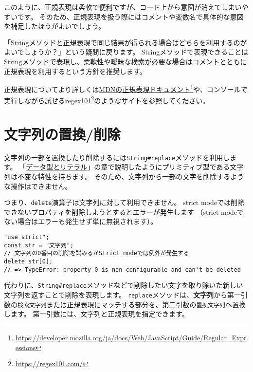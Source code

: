 このように、正規表現は柔軟で便利ですが、コード上から意図が消えてしまいやすいです。
そのため、正規表現を扱う際にはコメントや変数名で具体的な意図を補足したほうがよいでしょう。

「Stringメソッドと正規表現で同じ結果が得られる場合はどちらを利用するのがよいでしょうか？」という疑問に戻ります。
Stringメソッドで表現できることはStringメソッドで表現し、柔軟性や曖昧な検索が必要な場合はコメントとともに正規表現を利用するという方針を推奨します。

正規表現についてより詳しくは\href{https://developer.mozilla.org/ja/docs/Web/JavaScript/Guide/Regular_Expressions}{MDNの正規表現ドキュメント}\footnote{\url{https://developer.mozilla.org/ja/docs/Web/JavaScript/Guide/Regular_Expressions}}や、コンソールで実行しながら試せる\href{https://regex101.com/}{regex101}\footnote{\url{https://regex101.com/}}のようなサイトを参照してください。

\hypertarget{replace-delete}{%
\section{文字列の置換/削除}\label{replace-delete}}

文字列の一部を置換したり削除するには\texttt{String\#replace}メソッドを利用します。
「\hyperlink{data-type-and-literal}{データ型とリテラル}」の章で説明したようにプリミティブ型である文字列は不変な特性を持ちます。
そのため、文字列から一部の文字を削除するような操作はできません。

つまり、\texttt{delete}演算子は文字列に対して利用できません。
strict
modeでは削除できないプロパティを削除しようとするとエラーが発生します
（strict modeでない場合はエラーも発生せず単に無視されます）。

\begin{lstlisting}
"use strict";
const str = "文字列";
// 文字列の0番目の削除を試みるがStrict modeでは例外が発生する
delete str[0]; 
// => TypeError: property 0 is non-configurable and can't be deleted
\end{lstlisting}

代わりに、\texttt{String\#replace}メソッドなどで削除したい文字を取り除いた新しい文字列を返すことで削除を表現します。
\texttt{replace}メソッドは、\textbf{文字列}から第一引数の\texttt{検索文字列}または正規表現にマッチする部分を、第二引数の\texttt{置換文字列}へ置換します。
第一引数には、文字列と正規表現を指定できます。

